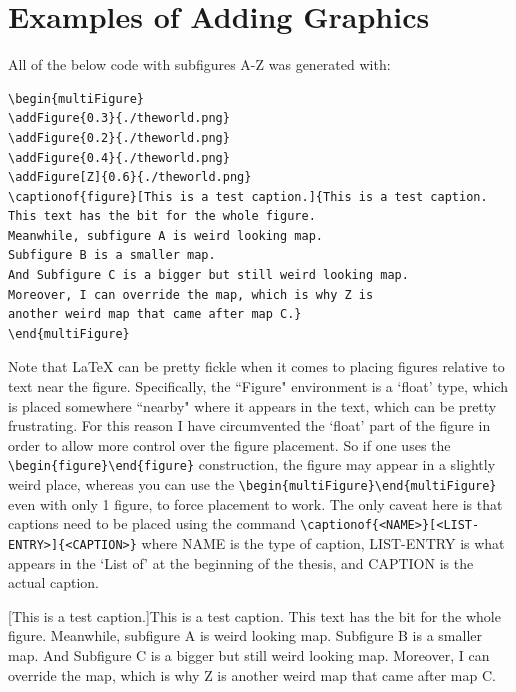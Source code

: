 \section{Examples of Adding Graphics}
\label{Sec:addingGraphics}
All of the below code with subfigures A-Z was generated with:
\begin{verbatim}
\begin{multiFigure}
\addFigure{0.3}{./theworld.png}
\addFigure{0.2}{./theworld.png}
\addFigure{0.4}{./theworld.png}
\addFigure[Z]{0.6}{./theworld.png}
\captionof{figure}[This is a test caption.]{This is a test caption. 
This text has the bit for the whole figure. 
Meanwhile, subfigure A is weird looking map. 
Subfigure B is a smaller map. 
And Subfigure C is a bigger but still weird looking map. 
Moreover, I can override the map, which is why Z is 
another weird map that came after map C.}
\end{multiFigure}
\end{verbatim}
Note that \LaTeX{} can be pretty fickle when it comes to placing figures relative to text near the figure. Specifically, the ``Figure" environment is a `float' type, which is placed somewhere ``nearby" where it appears in the text, which can be pretty frustrating. For this reason I have circumvented the `float' part of the figure in order to allow more control over the figure placement. So if one uses the \verb|\begin{figure}\end{figure}| construction, the figure may appear in a slightly weird place, whereas you can use the \verb|\begin{multiFigure}\end{multiFigure}| even with only 1 figure, to force placement to work. The only caveat here is that captions need to be placed using the command \verb|\captionof{<NAME>}[<LIST-ENTRY>]{<CAPTION>}| where NAME is the type of caption, LIST-ENTRY is what appears in the `List of' at the beginning of the thesis, and CAPTION is the actual caption.

\begin{multiFigure}
[This is a test caption.]{This is a test caption. This text has the bit for the whole figure. Meanwhile, subfigure A is weird looking map. Subfigure B is a smaller map. And Subfigure C is a bigger but still weird looking map. Moreover, I can override the map, which is why Z is another weird map that came after map C.}
\end{multiFigure}



